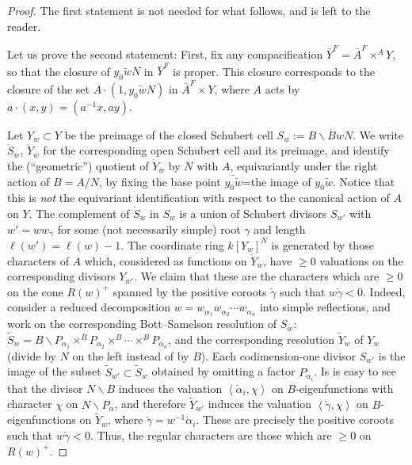 \begin{proof}
 The first statement is not needed for what follows, and is left to the reader.

Let us prove the second statement: First, fix any compacification $\bar Y^F =\bar A^F \times^A Y$, so that the closure of $y_0 \tilde w N$ in $\bar Y^F$ is proper. This closure corresponds to the closure of the set $A\cdot (1,y_0\tilde w N)$ in $\bar A^F \times Y$, where $A$ acts by $a\cdot (x,y) = (a^{-1} x, a y)$. 

Let $Y_w\subset Y$ be the preimage of the closed Schubert cell $S_w:=\overline{B\backslash B w N}$. We write $\mathring S_w$, $\mathring Y_w$ for the corresponding open Schubert cell and its preimage, and identify the (``geometric'') quotient of $\mathring Y_w$ by $N$ with $A$, equivariantly under the right action of $B=A/N$, by fixing the base point $\overline{y_0\tilde w}$=the image of $y_0\tilde w$. Notice that this is \emph{not} the equivariant identification with respect to the canonical action of $A$ on $Y$.
The complement of $\mathring S_w$ in $S_w$ is a union of Schubert divisors $S_{w'}$ with $w' = w w_\gamma$ for some (not necessarily simple) root $\gamma$ and length $\ell(w') = \ell(w)-1$. The coordinate ring $k[Y_w]^N$ is generated by those characters of $A$ which, considered as functions on $\mathring Y_w$, have $\ge 0$ valuations on the corresponding divisors $Y_{w'}$. We claim that these are the characters which are $\ge 0$ on the cone $R(w)^+$ spanned by the positive coroots $\check\gamma$ such that $w\check\gamma <0$. Indeed, consider a reduced decomposition $w= w_{\alpha_1} w_{\alpha_2} \cdots w_{\alpha_n}$ into simple reflections, and work on the corresponding Bott--Samelson resolution of $S_w$: $\tilde S_w = B\backslash P_{\alpha_1} \times^B P_{\alpha_2} \times^B \cdots \times^B P_{\alpha_n}$, and the corresponding resolution $\tilde Y_w$ of $Y_w$ (divide by $N$ on the left instead of by $B$). Each codimension-one divisor $S_{w'}$ is the image of the subset $\tilde S_{w'}\subset \tilde S_w$ obtained by omitting a factor $P_{\alpha_i}$. Is is easy to see that the divisor $N\backslash B$ induces the valuation $\left<\check\alpha_i, \chi\right>$ on $B$-eigenfunctions with character $\chi$ on $N\backslash P_\alpha$, and therefore $\tilde Y_{w'}$ induces the valuation $\left<\check\gamma, \chi\right>$ on $B$-eigenfunctions on $\tilde Y_w$, where $\check\gamma = w^{-1}\check\alpha_i$. These are precisely the positive coroots such that $w\check\gamma <0$. Thus, the regular characters are those which are $\ge 0$ on $R(w)^+$. 



\end{proof}

